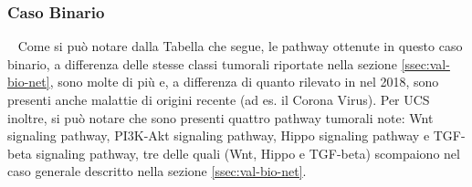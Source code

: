 \subsubsection{Caso Binario}~\newline
Come si può notare dalla Tabella che segue, le pathway ottenute in questo caso binario, a differenza delle
stesse classi tumorali riportate nella sezione \ref{ssec:val-bio-net}, sono molte di più e, a differenza
di quanto rilevato in \cite{lyu2018deep} nel 2018, sono presenti anche malattie di origini recente (ad es. il Corona
Virus).
Per UCS inoltre, si può notare che sono presenti quattro pathway tumorali note: Wnt signaling pathway, PI3K-Akt
signaling pathway, Hippo signaling pathway e TGF-beta signaling pathway, tre delle quali (Wnt, Hippo e TGF-beta)
scompaiono nel caso generale descritto nella sezione \ref{ssec:val-bio-net}.

